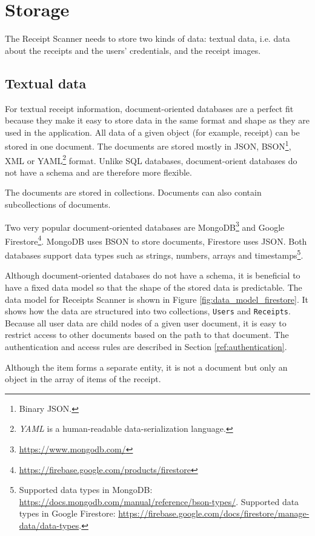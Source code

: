 \documentclass[
  digital, %
  table,   %
  oneside, %
  lof,     %
  lot,     %
]{fithesis3}
\newcommand{\definition}[1]{\textit{#1}}
\begin{document}
\section{Storage}
\label{sec:storage}
The Receipt Scanner needs to store two kinds of data: textual data, i.e. data about the receipts and the users' credentials, and the receipt images.

\subsection{Textual data}
For textual receipt information, document-oriented databases are a perfect fit because they make it easy to store data in the same format and shape as they are used in the application. 
All data of a given object (for example, receipt) can be stored in one document. The documents are stored mostly in JSON, BSON\footnote{Binary JSON.}, XML or YAML\footnote{\definition{YAML} is a human-readable data-serialization language.} format. Unlike SQL databases, document-orient databases do not have a schema and are therefore more flexible.

The documents are stored in collections. Documents can also contain subcollections of documents.

Two very popular document-oriented databases are MongoDB\footnote{\url{https://www.mongodb.com/}} and Google Firestore\footnote{\url{https://firebase.google.com/products/firestore}}. MongoDB uses BSON to store documents, Firestore uses JSON. Both databases support data types such as strings, numbers, arrays and timestamps\footnote{Supported data types in MongoDB: \url{https://docs.mongodb.com/manual/reference/bson-types/}.
Supported data types in Google Firestore: \url{https://firebase.google.com/docs/firestore/manage-data/data-types}.}.

Although document-oriented databases do not have a schema, it is beneficial to have a fixed data model so that the shape of the stored data is predictable.
The data model for Receipts Scanner is shown in Figure \ref{fig:data_model_firestore}. It shows how the data are structured into two collections, \texttt{Users} and \texttt{Receipts}. Because all user data are child nodes of a given user document, it is easy to restrict access to other documents based on the path to that document. The authentication and access rules are described in Section \ref{ref:authentication}.

Although the item forms a separate entity, it is not a document but only an object in the array of items of the receipt.
\end{document}
